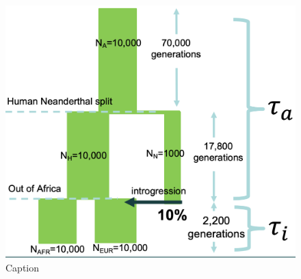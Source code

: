 \begin{figure}[htb]
    \centering
    \includegraphics[width=\textwidth]{chapter5/figures/fig5.4.png}
    \caption{Caption}
    \label{fig:5.4}
\end{figure}